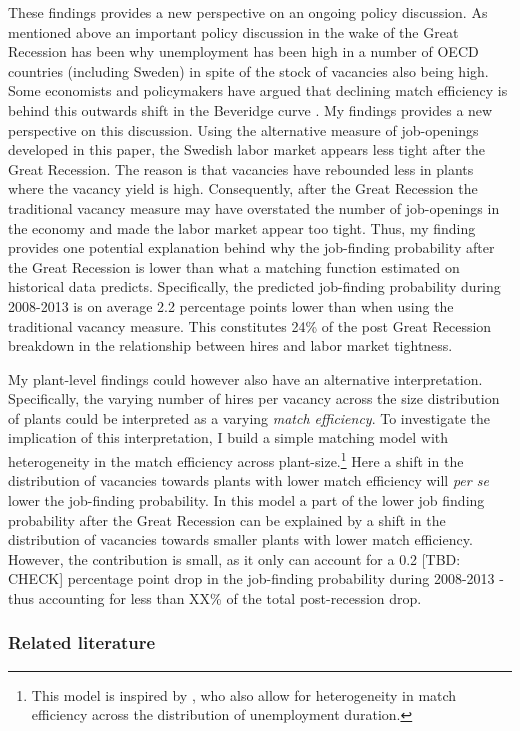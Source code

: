 These findings provides a new perspective on an ongoing policy discussion. As mentioned above an important policy discussion in the wake of the Great Recession has been why unemployment has been high in a number of OECD countries (including Sweden) in spite of the stock of vacancies also being high. Some economists and policymakers have argued that declining match efficiency is behind this outwards shift in the Beveridge curve \citep{Hall2015, Riksbank2012}. My findings provides a new perspective on this discussion. Using the alternative measure of job-openings developed in this paper, the Swedish labor market appears less tight after the Great Recession. The reason is that vacancies have rebounded less in plants where the vacancy yield is high. Consequently, after the Great Recession the traditional vacancy measure may have overstated the number of job-openings in the economy and made the labor market appear too tight. Thus, my finding provides one potential explanation behind why the job-finding probability after the Great Recession is lower than what a matching function estimated on historical data predicts. Specifically, the predicted job-finding probability during 2008-2013 is on average 2.2 percentage points lower than when using the traditional vacancy measure. This constitutes 24\% of the post Great Recession breakdown in the relationship between hires and labor market tightness. 

My plant-level findings could however also have an alternative interpretation. Specifically, the varying number of hires per vacancy across the size distribution of plants could be interpreted as a varying \emph{match efficiency}. To investigate the implication of this interpretation, I build a simple matching model with heterogeneity in the match efficiency across plant-size.\footnote{This model is inspired by \cite{Kroft2016}, who also allow for heterogeneity in match efficiency across the distribution of unemployment duration.} Here a shift in the distribution of vacancies towards plants with lower match efficiency will \emph{per se} lower the job-finding probability. In this model a part of the lower job finding probability after the Great Recession can be explained by a shift in the distribution of vacancies towards smaller plants with lower match efficiency. However, the contribution is small, as it only can account for a 0.2 [TBD: CHECK] percentage point drop in the job-finding probability during 2008-2013 - thus accounting for less than XX\% of the total post-recession drop.

\subsubsection{Related literature}


